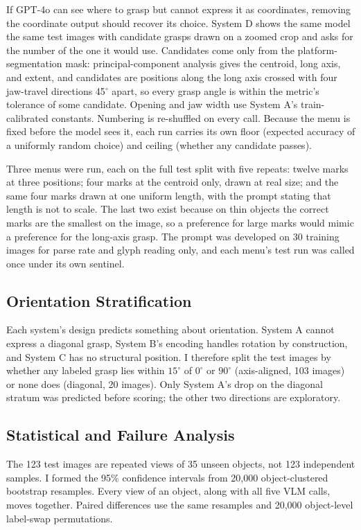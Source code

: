 \documentclass[10pt,conference]{IEEEtran}
\begin{document}
If GPT-4o can see where to grasp but cannot express it as coordinates,
removing the coordinate output should recover its choice. System D shows the
same model the same test images with candidate grasps drawn on a zoomed crop
and asks for the number of the one it would use. Candidates come only from
the platform-segmentation mask: principal-component analysis gives the
centroid, long axis, and extent, and candidates are positions along the long
axis crossed with four jaw-travel directions 45$^\circ$ apart, so every grasp
angle is within the metric's tolerance of some candidate. Opening and jaw
width use System A's train-calibrated constants. Numbering is re-shuffled on
every call. Because the menu is fixed before the model sees it, each run
carries its own floor (expected accuracy of a uniformly random choice) and
ceiling (whether any candidate passes).

Three menus were run, each on the full test split with five repeats: twelve
marks at three positions; four marks at the centroid only, drawn at real
size; and the same four marks drawn at one uniform length, with the prompt
stating that length is not to scale. The last two exist because on thin
objects the correct marks are the smallest on the image, so a preference for
large marks would mimic a preference for the long-axis grasp. The prompt was
developed on 30 training images for parse rate and glyph reading only, and
each menu's test run was called once under its own sentinel.

\subsection{Orientation Stratification}

Each system's design predicts something about orientation. System A cannot
express a diagonal grasp, System B's encoding handles rotation by
construction, and System C has no structural position. I therefore split
the test images by whether any labeled grasp lies within $15^\circ$ of
$0^\circ$ or $90^\circ$ (axis-aligned, 103 images) or none does
(diagonal, 20 images). Only System A's drop on the diagonal stratum was
predicted before scoring; the other two directions are exploratory.

\subsection{Statistical and Failure Analysis}

The 123 test images are repeated views of 35 unseen objects, not 123
independent samples. I formed the 95\% confidence intervals from 20,000
object-clustered bootstrap resamples. Every view of an object, along with all
five VLM calls, moves together. Paired differences use the same resamples and
20,000 object-level label-swap permutations.
\end{document}

